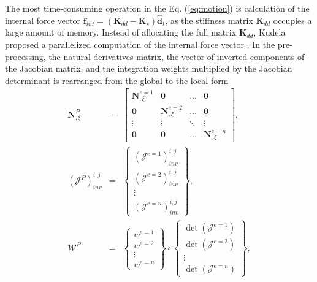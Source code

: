 \documentclass[11pt,a4paper,final]{report}
\theoremstyle{plain}
\begin{document}
The most time-consuming operation in the Eq. (\ref{eq:motion}) is calculation of the internal force vector \(\textbf{f}_{int}=\left(\textbf{K}_{dd}-\textbf{K}_{s}\right)\widehat{\textbf{d}}_{t}\), as the stiffness matrix \(\textbf{K}_{dd}\) occupies a large amount of memory.
Instead of allocating the full matrix \(\textbf{K}_{dd}\), Kudela proposed a parallelized computation of the internal force vector \cite{kudela2016parallel}.
In the pre-processing, the natural derivatives matrix, the vector of inverted components of the Jacobian matrix, and the integration weights multiplied by the Jacobian determinant is rearranged from the global to the local form
\begin{eqnarray}
	\label{eq:isoparametric}
	\textbf{N}^P_{,\xi} & = & \left[ \begin{array}{cccc}
		\textbf{N}^{e=1}_{,\xi} & \textbf{0} & \ldots & \textbf{0}\\
		\textbf{0} & \textbf{N}^{e=2}_{,\xi} & \ldots & \textbf{0}\\
		\vdots & \vdots &  \ddots & \vdots\\
		\textbf{0} & \textbf{0} & \ldots & \textbf{N}^{e=n}_{,\xi}
	\end{array}\right],\\
	\label{eq:jacob}
	\left(\mathcal{J}^P\right)^{i,j}_{inv} & = & \left\{ \begin{array}{c}
		\left(\mathcal{J}^{e=1}\right)^{i,j}_{inv}\\
		\left(\mathcal{J}^{e=2}\right)^{i,j}_{inv}\\
		\vdots\\
		\left(\mathcal{J}^{e=n}\right)^{i,j}_{inv} \end{array}\right\},\\
	\label{eq:intWeights}
	\mathcal{W}^P & = & \left\{ \begin{array}{c}
		w^{e=1}\\
		w^{e=2}\\
		\vdots\\
		w^{e=n} \end{array}\right\} \circ
	\left\{ \begin{array}{c}
		\det\left(\mathcal{J}^{e=1}\right)\\
		\det\left(\mathcal{J}^{e=2}\right)\\
		\vdots\\
		\det\left(\mathcal{J}^{e=n}\right)
	 \end{array}\right\},
\end{eqnarray}
\end{document}
